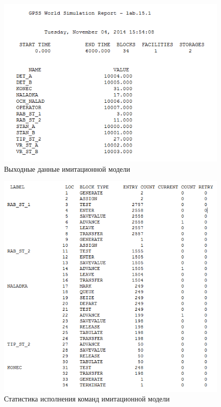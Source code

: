 \begin{figure}[h!]
  \centering
  \includegraphics[width=1\linewidth]{pic/report_1}
  \caption{Выходные данные имитационной модели}
  \label{pic:report_1}
\end{figure}

\newpage

\begin{figure}[h!]
  \centering
  \includegraphics[width=1\linewidth]{pic/report_2}
  \caption{Статистика исполнения команд имитационной модели}
  \label{pic:report_2}
\end{figure}

